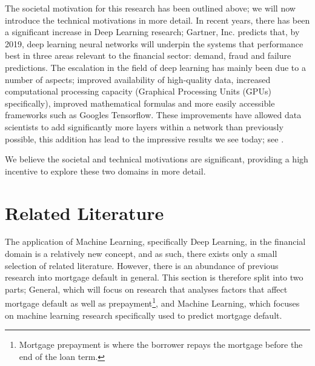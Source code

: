         The societal motivation for this research has been outlined above; we will now introduce the technical motivations in more detail. In recent years, there has been a significant increase in Deep Learning research; Gartner, Inc. predicts that, by 2019, deep learning neural networks will underpin the systems that performance best in three areas relevant to the financial sector: demand, fraud and failure predictions. The escalation in the field of deep learning has mainly been due to a number of aspects; improved availability of high-quality data, increased computational processing capacity (Graphical Processing Units (GPUs) specifically), improved mathematical formulas and more easily accessible frameworks such as Google\’s Tensorflow. These improvements have allowed data scientists to add significantly more layers within a network than previously possible, this addition has lead to the impressive results we see today; see \cite{nn_overview}.
        
        We believe the societal and technical motivations are significant, providing a high incentive to explore these two domains in more detail. 
        
        
    
        
        
    \section{Related Literature} \label{related_work}
    
        The application of Machine Learning, specifically Deep Learning, in the financial domain is a relatively new concept, and as such, there exists only a small selection of related literature. However, there is an abundance of previous research into mortgage default in general. This section is therefore split into two parts; General, which will focus on research that analyses factors that affect mortgage default as well as prepayment\footnote{Mortgage prepayment is where the borrower repays the mortgage before the end of the loan term.}, and Machine Learning, which focuses on machine learning research specifically used to predict mortgage default.  
            
